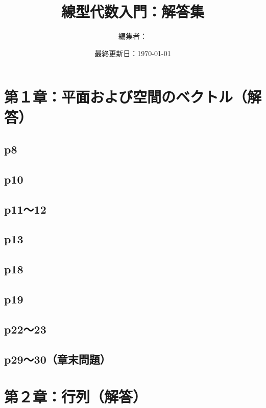 \documentclass[dvipdfmx,uplatex,11pt]{jsarticle}
\title{線型代数入門：解答集}
\author{編集者：}
\date{最終更新日：\today}
\begin{document}
\maketitle
\tableofcontents
\newpage
%
%
%
\section{第１章：平面および空間のベクトル（解答）}
\subsection{p8}
%
%
%
\newpage
%
%
%
\subsection{p10}
%
%
%
\newpage
%
%
%
\subsection{p11〜12}
%
%
%
\newpage
%
%
%
\subsection{p13}
%
%
%
\newpage
%
%
%
\subsection{p18}
%
%
%
\newpage
%
%
%
\subsection{p19}
%
%
%
\newpage
%
%
%
\subsection{p22〜23}
%
%
%
\newpage
%
%
%
\subsection{p29〜30（章末問題）}
%
%
%
\newpage
%
%
%
\section{第２章：行列（解答）}
\end{document}
